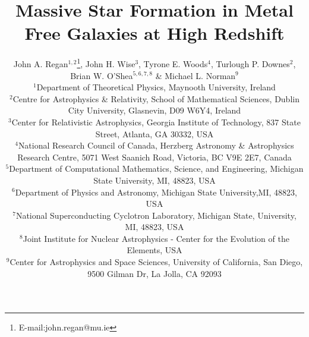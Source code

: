 \documentclass[graphics, twocolumn, usenatbib]{mn2e}
\begin{document}
\title{Massive Star Formation in Metal Free Galaxies at High Redshift}
\author[J. A. Regan, J. H. Wise,  T. E. Woods, T.P. Downes, B.W. O'Shea \&  M.L. Norman]{John A. Regan$^{1,2}$\thanks{E-mail:john.regan@mu.ie},
  John H. Wise$^{3}$, Tyrone E. Woods$^{4}$, Turlough P. Downes$^{2}$, \newauthor Brian W. O'Shea$^{5,6,7,8}$ \& Michael L. Norman$^9$\\
  $^1$Department of Theoretical Physics, Maynooth University, Ireland\\
  $^2$Centre for Astrophysics \& Relativity, School of Mathematical Sciences, Dublin City University, Glasnevin, D09 W6Y4, Ireland\\
  $^3$Center for Relativistic Astrophysics, Georgia Institute of Technology, 837 State Street, Atlanta, GA 30332, USA\\
  $^4$National Research Council of Canada, Herzberg Astronomy \& Astrophysics Research Centre, 5071 West Saanich Road, Victoria, BC V9E 2E7, Canada\\
  $^5$Department of Computational Mathematics, Science, and Engineering, Michigan State University, MI, 48823, USA\\    
  $^6$Department of Physics and Astronomy, Michigan State University,MI, 48823, USA\\
  $^7$National Superconducting Cyclotron Laboratory, Michigan State, University, MI, 48823, USA\\
  $^8$Joint Institute for Nuclear Astrophysics - Center for the Evolution of the Elements, USA\\
  $^9$Center for Astrophysics and Space Sciences, University of California, San Diego, 9500 Gilman Dr, La Jolla, CA 92093\\}

\label{firstpage}
\pagerange{\pageref{firstpage}--\pageref{lastpage}}
\maketitle
\end{document}
